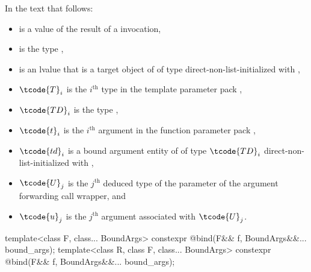 \pnum
In the text that follows:
\begin{itemize}
\item {} is a value of the result of a  invocation,
\item {} is the type ,
\item {} is an lvalue that
  is a target object of  of type 
  direct-non-list-initialized with ,
\item $\tcode{T}_i$ is the $i^\text{th}$ type in the template parameter pack ,
\item $\tcode{TD}_i$ is the type ,
\item $\tcode{t}_i$ is the $i^\text{th}$ argument in the function parameter pack ,
\item $\tcode{td}_i$ is a bound argument entity
  of  of type $\tcode{TD}_i$
  direct-non-list-initialized with
  ,
\item $\tcode{U}_j$ is the $j^\text{th}$ deduced type of the  parameter
  of the argument forwarding call wrapper, and
\item $\tcode{u}_j$ is the $j^\text{th}$ argument associated with $\tcode{U}_j$.
\end{itemize}

%
\begin{itemdecl}
template<class F, class... BoundArgs>
  constexpr @\unspec@ bind(F&& f, BoundArgs&&... bound_args);
template<class R, class F, class... BoundArgs>
  constexpr @\unspec@ bind(F&& f, BoundArgs&&... bound_args);
\end{itemdecl}

